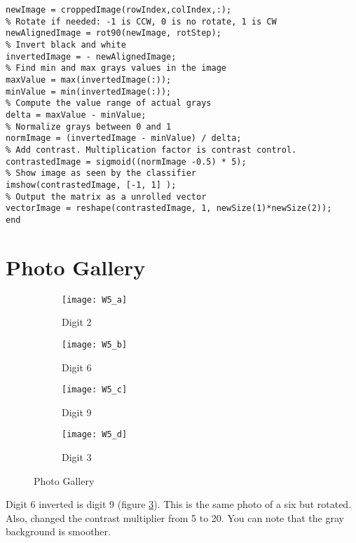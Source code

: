 \begin{Verbatim}[fontsize=\small]
% Copy just the indexed values from old image to get new image
newImage = croppedImage(rowIndex,colIndex,:);
% Rotate if needed: -1 is CCW, 0 is no rotate, 1 is CW
newAlignedImage = rot90(newImage, rotStep);
% Invert black and white
invertedImage = - newAlignedImage;
% Find min and max grays values in the image
maxValue = max(invertedImage(:));
minValue = min(invertedImage(:));
% Compute the value range of actual grays
delta = maxValue - minValue;
% Normalize grays between 0 and 1
normImage = (invertedImage - minValue) / delta;
% Add contrast. Multiplication factor is contrast control.
contrastedImage = sigmoid((normImage -0.5) * 5);
% Show image as seen by the classifier
imshow(contrastedImage, [-1, 1] );
% Output the matrix as a unrolled vector
vectorImage = reshape(contrastedImage, 1, newSize(1)*newSize(2));
end
\end{Verbatim}
\section{Photo Gallery}
\begin{figure}[ht]
     \centering
     \begin{subfigure}[b]{0.47\textwidth}
         \centering
         \texttt{[image: W5\_a]}
         \caption{Digit 2}
         \label{fig:W5_a}
     \end{subfigure}
     \hfill
     \begin{subfigure}[b]{0.47\textwidth}
         \centering
         \texttt{[image: W5\_b]}
         \caption{Digit 6}
         \label{fig:W5_b}
     \end{subfigure}
     \hfill
     \begin{subfigure}[b]{0.47\textwidth}
         \centering
         \texttt{[image: W5\_c]}
         \caption{Digit 9}
         \label{fig:W5_c}
     \end{subfigure}
     \hfill
     \begin{subfigure}[b]{0.47\textwidth}
         \centering
         \texttt{[image: W5\_d]}
         \caption{Digit 3}
         \label{fig:W5_d}
     \end{subfigure}
        \caption{Photo Gallery}
        \label{fig:W5_gallery}
\end{figure}
Digit 6 inverted is digit 9 (figure \ref{fig:W5_c}). This is the same photo of a six but rotated. Also, changed the contrast multiplier from 5 to 20. You can note that the gray background is smoother.
